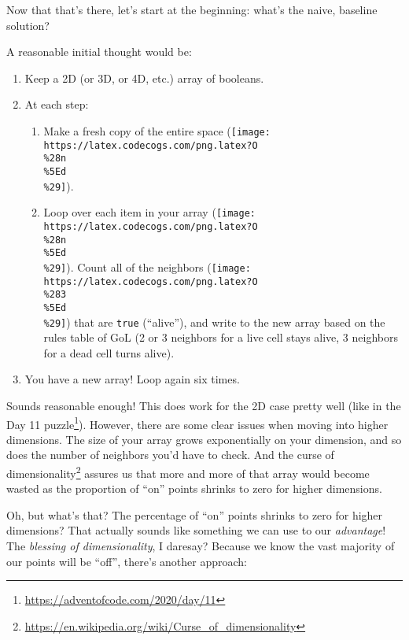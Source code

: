 \documentclass[]{article}
\renewcommand{\href}[2]{#2\footnote{\url{#1}}}
\begin{document}
Now that that's there, let's start at the beginning: what's the naive, baseline
solution?

A reasonable initial thought would be:

\begin{enumerate}
\def\labelenumi{\arabic{enumi}.}
\tightlist
\item
  Keep a 2D (or 3D, or 4D, etc.) array of booleans.
\item
  At each step:

  \begin{enumerate}
  \def\labelenumii{\alph{enumii}.}
  \tightlist
  \item
    Make a fresh copy of the entire space
    (\texttt{[image: https://latex.codecogs.com/png.latex?O\\\%28n\\\%5Ed\\\%29]}).
  \item
    Loop over each item in your array
    (\texttt{[image: https://latex.codecogs.com/png.latex?O\\\%28n\\\%5Ed\\\%29]}).
    Count all of the neighbors
    (\texttt{[image: https://latex.codecogs.com/png.latex?O\\\%283\\\%5Ed\\\%29]})
    that are \texttt{true} (``alive''), and write to the new array based on the
    rules table of GoL (2 or 3 neighbors for a live cell stays alive, 3
    neighbors for a dead cell turns alive).
  \end{enumerate}
\item
  You have a new array! Loop again six times.
\end{enumerate}

Sounds reasonable enough! This does work for the 2D case pretty well (like in
the \href{https://adventofcode.com/2020/day/11}{Day 11 puzzle}). However, there
are some clear issues when moving into higher dimensions. The size of your array
grows exponentially on your dimension, and so does the number of neighbors you'd
have to check. And the
\href{https://en.wikipedia.org/wiki/Curse_of_dimensionality}{curse of
dimensionality} assures us that more and more of that array would become wasted
as the proportion of ``on'' points shrinks to zero for higher dimensions.

Oh, but what's that? The percentage of ``on'' points shrinks to zero for higher
dimensions? That actually sounds like something we can use to our
\emph{advantage}! The \emph{blessing of dimensionality}, I daresay? Because we
know the vast majority of our points will be ``off'', there's another approach:
\end{document}
